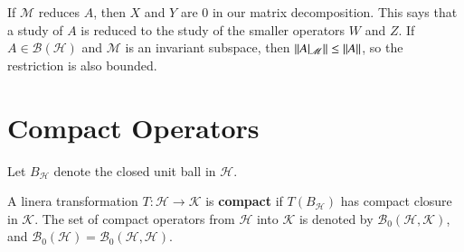 If $\mathscr{M}$ reduces $A$, then $X$ and $Y$ are $0$ in our matrix decomposition. This says that a study of $A$ is reduced to the study of the smaller operators $W$ and $Z$. If $A \in \mathscr{B}(\mathscr{H})$ and $\mathscr{M}$ is an invariant subspace, then $\left|\left| A\vert_{\mathscr{M}}\right|\right| \leq \left|\left| A\right|\right|$, so the restriction is also bounded.


\section{Compact Operators}
\label{sec:comp}

Let $B_{\mathscr{H}}$ denote the closed unit ball in $\mathscr{H}$.

\begin{defn}
    A linera transformation $T:\mathscr{H}\rightarrow \mathscr{K}$ is \textbf{compact} if $T(B_{\mathscr{H}})$ has compact closure in $\mathscr{K}$. The set of compact operators from $\mathscr{H}$ into $\mathscr{K}$ is denoted by $\mathscr{B}_0(\mathscr{H},\mathscr{K})$, and $\mathscr{B}_0(\mathscr{H}) = \mathscr{B}_0(\mathscr{H},\mathscr{H})$.
\end{defn}

